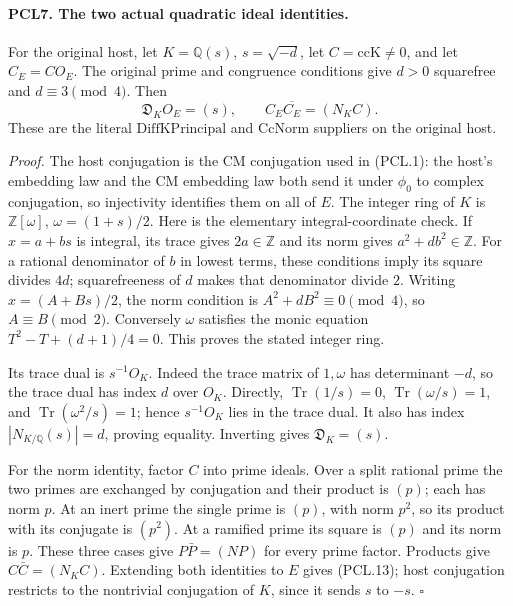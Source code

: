 \paragraph{PCL7. The two actual quadratic ideal identities.}
\label{claim:PCL7}
For the original host, let \(K=\mathbb Q(s)\),
\(s=\sqrt{-d}\), let \(C=\mathrm{ccK}\ne0\), and
let \(C_E=CO_E\).  The original prime and congruence
conditions give \(d>0\) squarefree and \(d\equiv3\pmod4\).
Then
\[
       \mathfrak D_K O_E=(s),\qquad
          C_E\overline{C_E}=(N_K C).                \tag{PCL.13}
\]
These are the literal \(\mathrm{DiffKPrincipal}\) and
\(\mathrm{CcNorm}\) suppliers on the original host.

\emph{Proof.}
The host conjugation is the CM conjugation used in
(PCL.1): the host's embedding law and the CM embedding
law both send it under \(\phi_0\) to complex conjugation,
so injectivity identifies them on all of \(E\).
The integer ring of \(K\) is
\(\mathbb Z[\omega]\), \(\omega=(1+s)/2\).
Here is the elementary integral-coordinate check.  If
\(x=a+bs\) is integral, its trace gives \(2a\in\mathbb Z\)
and its norm gives \(a^2+db^2\in\mathbb Z\).
For a rational denominator of \(b\) in lowest terms,
these conditions imply its square divides \(4d\);
squarefreeness of \(d\) makes that denominator divide
\(2\).  Writing \(x=(A+Bs)/2\), the norm condition is
\(A^2+dB^2\equiv0\pmod4\), so \(A\equiv B\pmod2\).
Conversely \(\omega\) satisfies the monic equation
\(T^2-T+(d+1)/4=0\).  This proves the stated integer ring.

Its trace dual is \(s^{-1}O_K\).  Indeed the trace matrix
of \(1,\omega\) has determinant \(-d\), so the trace dual
has index \(d\) over \(O_K\).  Directly,
\(\operatorname{Tr}(1/s)=0\),
\(\operatorname{Tr}(\omega/s)=1\), and
\(\operatorname{Tr}(\omega^2/s)=1\); hence
\(s^{-1}O_K\) lies in the trace dual.  It also has index
\(|N_{K/\mathbb Q}(s)|=d\), proving equality.
Inverting gives \(\mathfrak D_K=(s)\).

For the norm identity, factor \(C\) into prime ideals.
Over a split rational prime the two primes are exchanged
by conjugation and their product is \((p)\); each has
norm \(p\).  At an inert prime the single prime is
\((p)\), with norm \(p^2\), so its product with its
conjugate is \((p^2)\).  At a ramified prime its square
is \((p)\) and its norm is \(p\).  These three cases
give \(P\bar P=(NP)\) for every prime factor.  Products
give \(C\bar C=(N_K C)\).  Extending both identities
to \(E\) gives (PCL.13); host conjugation restricts to
the nontrivial conjugation of \(K\), since it sends
\(s\) to \(-s\). \hfill\(\square\)

